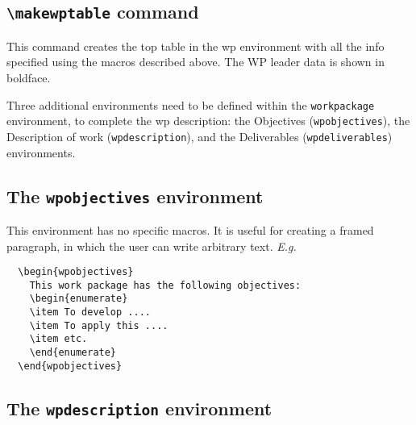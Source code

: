 \documentclass[pdftext]{article}
\begin{document}
\subsection{\texttt{\textbackslash makewptable} command}
\label{sec:makewptable}

This command creates the top table in the wp environment with all the
info specified using the macros described above. The WP leader data is
shown in boldface.

Three additional environments need to be defined within the
\texttt{workpackage} environment, to complete the wp description: the
Objectives (\texttt{wpobjectives}), the Description of work
(\texttt{wpdescription}), and the Deliverables
(\texttt{wpdeliverables}) environments.

\subsection{The \texttt{wpobjectives} environment}
\label{sec:object-envir}

This environment has no specific macros. It is useful for creating a
framed paragraph, in which the user can write arbitrary
text. \emph{E.g.}
\begin{verbatim}
  \begin{wpobjectives}
    This work package has the following objectives:
    \begin{enumerate}
    \item To develop ....
    \item To apply this ....
    \item etc.
    \end{enumerate}
  \end{wpobjectives}
\end{verbatim}

\subsection{The \texttt{wpdescription} environment}
\label{sec:descr-work-envir}
\end{document}
